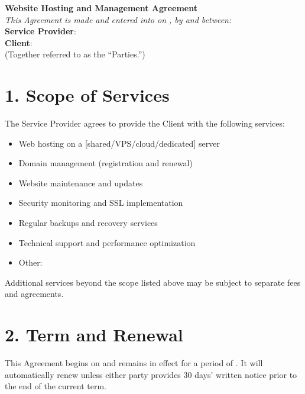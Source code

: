 \documentclass[12pt]{article}
\begin{document}
\begin{center}
    {\LARGE \textbf{Website Hosting and Management Agreement}}\\[1em]
    \textit{This Agreement is made and entered into on \underline{\hspace{4cm}}, by and between:}\\[1em]
    \textbf{Service Provider}: \underline{\hspace{8cm}}\\
    \textbf{Client}: \underline{\hspace{8cm}}\\
    (Together referred to as the “Parties.”)
\end{center}

\section*{1. Scope of Services}
The Service Provider agrees to provide the Client with the following services:
\begin{itemize}[noitemsep]
    \item Web hosting on a [shared/VPS/cloud/dedicated] server
    \item Domain management (registration and renewal)
    \item Website maintenance and updates
    \item Security monitoring and SSL implementation
    \item Regular backups and recovery services
    \item Technical support and performance optimization
    \item Other: \underline{\hspace{6cm}}
\end{itemize}

Additional services beyond the scope listed above may be subject to separate fees and agreements.

\section*{2. Term and Renewal}
This Agreement begins on \underline{\hspace{3cm}} and remains in effect for a period of \underline{\hspace{2cm}}. It will automatically renew unless either party provides 30 days’ written notice prior to the end of the current term.
\end{document}
